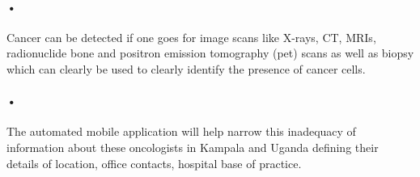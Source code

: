 \documentclass[12pt]{article}
\begin{document}
\paragraph{•}Cancer can be detected if one goes for image scans like X-rays, CT, MRIs, radionuclide bone and positron emission tomography (pet) scans as well as biopsy which can clearly be used to clearly identify the presence of cancer cells.



\paragraph{•}The automated mobile application will help narrow this inadequacy of information about these oncologists in Kampala and Uganda defining their details of location, office contacts, hospital base of practice.
\end{document}
